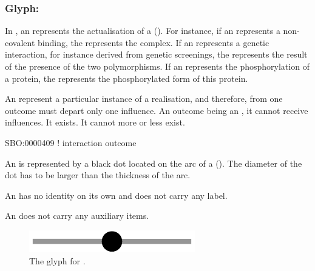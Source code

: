 
\subsubsection{Glyph: }\label{sec:outcome}

In \ERs, an  represents the actualisation of a  (). For instance, if an  represents a non-covalent binding, the  represents the complex. If an  represents a genetic interaction, for instance derived from genetic screenings, the  represents the result of the presence of the two polymorphisms. If an  represents the phosphorylation of a protein, the  represents the phosphorylated form of this protein.

An  represent a particular instance of a realisation, and therefore, from one outcome must depart only one influence. An outcome being an , it cannot receive influences. It exists. It cannot more or less exist. 

\begin{glyphDescription}

\glyphSboTerm SBO:0000409 ! interaction outcome

\glyphContainer  An  is represented by a black dot located on the arc of a  (). The diameter of the dot has to be larger than the thickness of the arc.

\glyphLabel An  has no identity on its own and does not carry any label. 

\glyphAux An  does not carry any auxiliary items.

\end{glyphDescription}

\begin{figure}[H]
  \centering
  \includegraphics[scale = 0.5]{images/outcome}
  \caption{The \ER glyph for .}
  \label{fig:outcome}
\end{figure}

